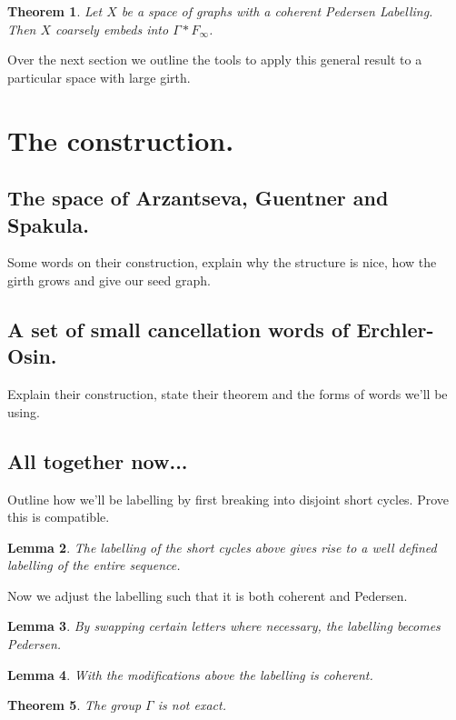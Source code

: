 \documentclass[11pt,a4paper]{amsart}
\theoremstyle{plain}
\newtheorem{theorem}{Theorem}%
\newtheorem{lemma}[theorem]{Lemma}%
\theoremstyle{definition}%
\theoremstyle{remark}%
\begin{document}
\begin{theorem}
Let $X$ be a space of graphs with a coherent Pedersen Labelling. Then $X$ coarsely embeds into $\Gamma \ast F_{\infty}$.
\end{theorem}

Over the next section we outline the tools to apply this general result to a particular space with large girth.

\section{The construction.}

\subsection{The space of Arzantseva, Guentner and Spakula.}

Some words on their construction, explain why the structure is nice, how the girth grows and give our seed graph.

\subsection{A set of small cancellation words of Erchler-Osin.}

Explain their construction, state their theorem and the forms of words we'll be using.

\subsection{All together now...}

Outline how we'll be labelling by first breaking into disjoint short cycles. Prove this is compatible.

\begin{lemma}
The labelling of the short cycles above gives rise to a well defined labelling of the entire sequence.
\end{lemma}

Now we adjust the labelling such that it is both coherent and Pedersen.

\begin{lemma}
By swapping certain letters where necessary, the labelling becomes Pedersen.
\end{lemma}

\begin{lemma}
With the modifications above the labelling is coherent.
\end{lemma}

\begin{theorem}
The group $\Gamma$ is not exact.
\end{theorem}




\end{document}
